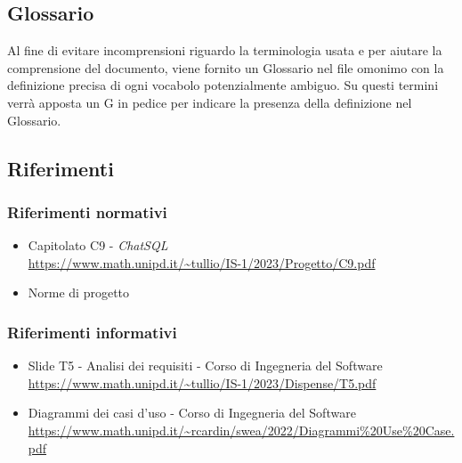 \subsection{Glossario}
Al fine di evitare incomprensioni riguardo la terminologia usata e per aiutare la comprensione del documento, viene fornito un Glossario nel file omonimo con la definizione precisa di ogni vocabolo potenzialmente ambiguo. Su questi termini verrà apposta un G in pedice per indicare la presenza della definizione nel Glossario.

\subsection{Riferimenti}
\subsubsection{Riferimenti normativi}
\begin{itemize}
	\item Capitolato C9 - \textit{ChatSQL} \\ \url{https://www.math.unipd.it/~tullio/IS-1/2023/Progetto/C9.pdf}
	\item Norme di progetto
\end{itemize}

\subsubsection{Riferimenti informativi}
\begin{itemize}
	\item Slide T5 - Analisi dei requisiti - Corso di Ingegneria del Software \\ \url{https://www.math.unipd.it/~tullio/IS-1/2023/Dispense/T5.pdf}
	\item Diagrammi dei casi d'uso - Corso di Ingegneria del Software \\ \url{https://www.math.unipd.it/~rcardin/swea/2022/Diagrammi%20Use%20Case.pdf}
\end{itemize}